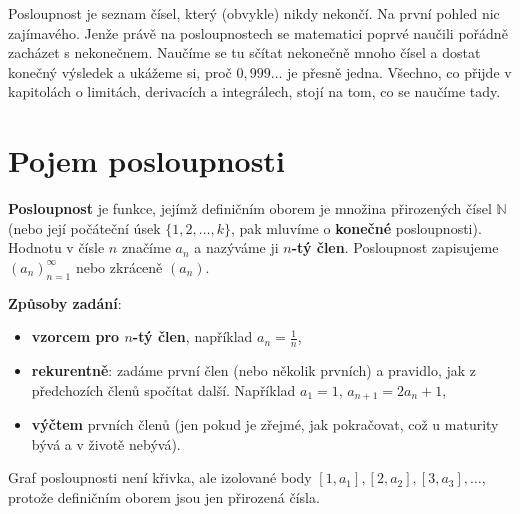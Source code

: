 \label{kap:posloupnosti}

Posloupnost je seznam čísel, který (obvykle) nikdy nekončí. Na první pohled nic zajímavého. Jenže právě na posloupnostech se matematici poprvé naučili pořádně zacházet s nekonečnem. Naučíme se tu sčítat nekonečně mnoho čísel a dostat konečný výsledek a ukážeme si, proč $0{,}999\ldots$ je přesně jedna. Všechno, co přijde v kapitolách o limitách, derivacích a integrálech, stojí na tom, co se naučíme tady.

\section{Pojem posloupnosti}\label{sec:pojem-posloupnosti}

\begin{definitionbox}
  \textbf{Posloupnost} je funkce, jejímž definičním oborem je množina přirozených čísel $\mathbb{N}$ (nebo její počáteční úsek $\{1, 2, \ldots, k\}$, pak mluvíme o \textbf{konečné} posloupnosti). Hodnotu v čísle $n$ značíme $a_n$ a nazýváme ji \textbf{$n$-tý člen}. Posloupnost zapisujeme ${(a_n)}_{n=1}^{\infty}$ nebo zkráceně $(a_n)$.

  \vspace{0.2cm}

  \textbf{Způsoby zadání}:
  \begin{itemize}
    \item \textbf{vzorcem pro $n$-tý člen}, například $a_n = \frac{1}{n}$,
    \item \textbf{rekurentně}: zadáme první člen (nebo několik prvních) a pravidlo, jak z předchozích členů spočítat další. Například $a_1 = 1$, $a_{n+1} = 2a_n + 1$,
    \item \textbf{výčtem} prvních členů (jen pokud je zřejmé, jak pokračovat, což u maturity bývá a v životě nebývá).
  \end{itemize}
\end{definitionbox}

Graf posloupnosti není křivka, ale izolované body $[1, a_1], [2, a_2], [3, a_3], \ldots$, protože definičním oborem jsou jen přirozená čísla.

